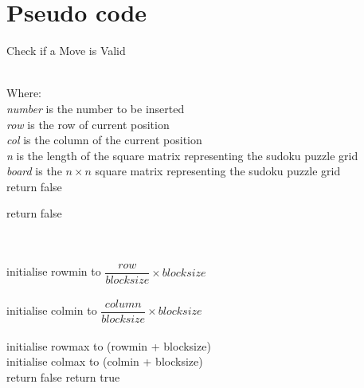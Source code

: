 \documentclass[12pt,a4paper,titlepage]{article}
\begin{document}
\section{Pseudo code}

\begin{algorithm}[H]
\caption{Check if  a Move is Valid}
\begin{algorithmic}[1]

\\
Where:
\\
\textit{number} is the number to be inserted
\\
\textit{row} is the row of current position
\\
\textit{col} is the column of the current position
\\
\textit{n} is the length of the square matrix representing the sudoku puzzle grid 
\\
\textit{board} is the $n \times n$ square matrix representing the sudoku puzzle grid 
\\

			\State return false
		\EndIf
	\EndFor 	

			\State return false
		\EndIf
	\EndFor	
	
	
	\\
	\\
	initialise rowmin to $ \dfrac{row}{blocksize} \times blocksize $
	\\
	\\	
	initialise colmin to $ \dfrac{column}{blocksize} \times blocksize $
	\\
	\\		
	initialise rowmax to (rowmin + blocksize)
	\\		
	initialise colmax to (colmin + blocksize)	
	\\
	
	   			\State return false
	 		\EndIf       
  		\EndFor
  	\EndFor
	\State return true
\EndFunction
\end{algorithmic}
\end{algorithm}

\end{document}
